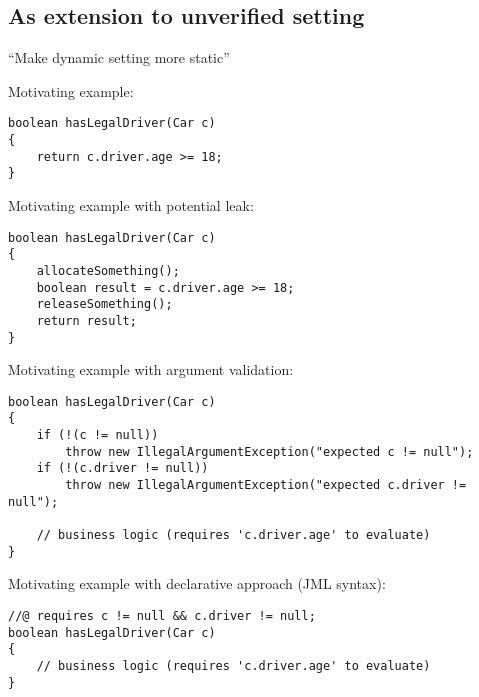 
\subsection{As extension to unverified setting}
“Make dynamic setting more static”

Motivating example:
\begin{lstlisting}
boolean hasLegalDriver(Car c)
{
    return c.driver.age >= 18;
}
\end{lstlisting}

Motivating example with potential leak:
\begin{lstlisting}
boolean hasLegalDriver(Car c)
{
    allocateSomething();
    boolean result = c.driver.age >= 18;
    releaseSomething();
    return result;
}
\end{lstlisting}

Motivating example with argument validation:
\begin{lstlisting}
boolean hasLegalDriver(Car c)
{
    if (!(c != null))
        throw new IllegalArgumentException("expected c != null");
    if (!(c.driver != null))
        throw new IllegalArgumentException("expected c.driver != null");
        
    // business logic (requires 'c.driver.age' to evaluate)
}
\end{lstlisting}

Motivating example with declarative approach (JML syntax):
\begin{lstlisting}
//@ requires c != null && c.driver != null;
boolean hasLegalDriver(Car c)
{
    // business logic (requires 'c.driver.age' to evaluate)
}
\end{lstlisting}


